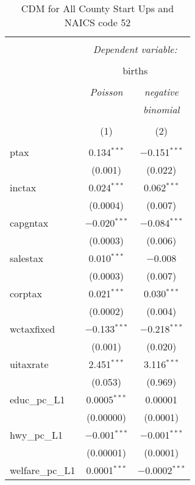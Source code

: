 
\begin{table}[!htbp] \centering 
  \caption{CDM for All County Start Ups and NAICS code 52} 
  \label{} 
\begin{tabular}{@{\extracolsep{5pt}}lcc} 
\\[-1.8ex]\hline 
\hline \\[-1.8ex] 
 & \multicolumn{2}{c}{\textit{Dependent variable:}} \\ 
\cline{2-3} 
\\[-1.8ex] & \multicolumn{2}{c}{births} \\ 
\\[-1.8ex] & \textit{Poisson} & \textit{negative} \\ 
 & \textit{} & \textit{binomial} \\ 
\\[-1.8ex] & (1) & (2)\\ 
\hline \\[-1.8ex] 
 ptax & 0.134$^{***}$ & $-$0.151$^{***}$ \\ 
  & (0.001) & (0.022) \\ 
  inctax & 0.024$^{***}$ & 0.062$^{***}$ \\ 
  & (0.0004) & (0.007) \\ 
  capgntax & $-$0.020$^{***}$ & $-$0.084$^{***}$ \\ 
  & (0.0003) & (0.006) \\ 
  salestax & 0.010$^{***}$ & $-$0.008 \\ 
  & (0.0003) & (0.007) \\ 
  corptax & 0.021$^{***}$ & 0.030$^{***}$ \\ 
  & (0.0002) & (0.004) \\ 
  wctaxfixed & $-$0.133$^{***}$ & $-$0.218$^{***}$ \\ 
  & (0.001) & (0.020) \\ 
  uitaxrate & 2.451$^{***}$ & 3.116$^{***}$ \\ 
  & (0.053) & (0.969) \\ 
  educ\_pc\_L1 & 0.0005$^{***}$ & 0.00001 \\ 
  & (0.00000) & (0.0001) \\ 
  hwy\_pc\_L1 & $-$0.001$^{***}$ & $-$0.001$^{***}$ \\ 
  & (0.00001) & (0.0001) \\ 
  welfare\_pc\_L1 & 0.0001$^{***}$ & $-$0.0002$^{***}$ \\ 

\end{tabular}
\end{table}

